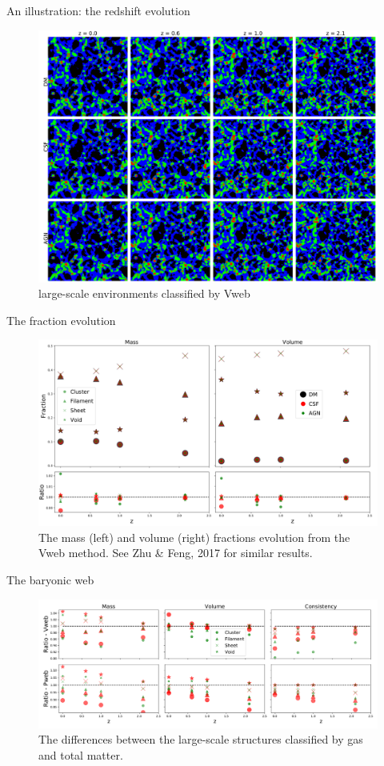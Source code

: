 \documentclass[aspectratio=43]{beamer}
\begin{document}
\begin{frame}{An illustration: the redshift evolution}
  \begin{figure}
    \includegraphics[width=0.8\linewidth]{Evolution-illustriation}
    \caption{large-scale environments classified by Vweb}
  \end{figure}
\end{frame}

\begin{frame}{The fraction evolution}
  \begin{figure}
    \includegraphics[width=0.9\linewidth]{Vweb-fraction-evolution.png}
    \caption{The mass (left) and volume (right) fractions evolution from the Vweb method. See Zhu \& Feng, 2017 for similar results.}
  \end{figure}
\end{frame}

\begin{frame}{The baryonic web}
  \begin{figure}
    \includegraphics[width=\linewidth]{fraction-gasweb-evolution.png}
    \caption{The differences between the large-scale structures classified by gas and total matter.}
  \end{figure}
\end{frame}
\end{document}
